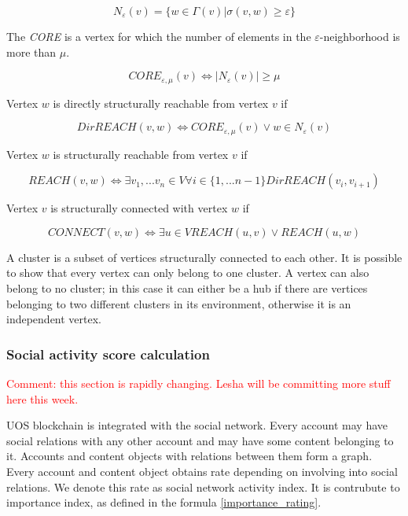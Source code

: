 \documentclass[a4paper,12pt]{article}
\begin{document}
$$
N_{\varepsilon}(v) = \{ w \in \Gamma(v) | \sigma(v,w) \ge \varepsilon \}
$$

The \textit{CORE} is a vertex for which the number of elements in the $\varepsilon$-neighborhood is more than $\mu$.

$$
CORE_{\varepsilon,\mu}(v) \Leftrightarrow |N_{\varepsilon} (v)| \ge \mu
$$

Vertex $w$ is directly structurally reachable from vertex $v$ if



$$
DirREACH(v,w) \Leftrightarrow CORE_{\varepsilon,\mu}(v) \vee w \in N_{\varepsilon}(v)
$$

Vertex $w$ is structurally reachable from vertex $v$ if


$$
REACH(v,w) \Leftrightarrow \exists v_1,...v_n \in V \forall i \in \{1,...n-1\}DirREACH(v_i,v_{i+1})
$$

Vertex $v$ is structurally connected with vertex $w$ if



$$
CONNECT(v,w) \Leftrightarrow \exists u \in V REACH(u,v) \vee REACH(u,w)
$$

A cluster is a subset of vertices structurally connected to each other. It is possible to show that every vertex can only belong to one cluster. A vertex can also belong to no cluster; in this case it can either be a hub if there are vertices belonging to two different clusters in its environment, otherwise it is an independent vertex.




\subsubsection{Social activity score calculation}
\textcolor{red}{Comment: this section is rapidly changing. Lesha will be committing more stuff here this week.}

U{\degree}OS blockchain is integrated with the social network. Every account may have social relations with any other account and may have some content belonging to it. Accounts and content objects with relations between them form a graph. Every account and content object obtains rate depending on involving into social relations. We denote this rate as social network activity index. It is contrubute to importance index, as defined in the formula \ref{importance_rating}.
\end{document}

